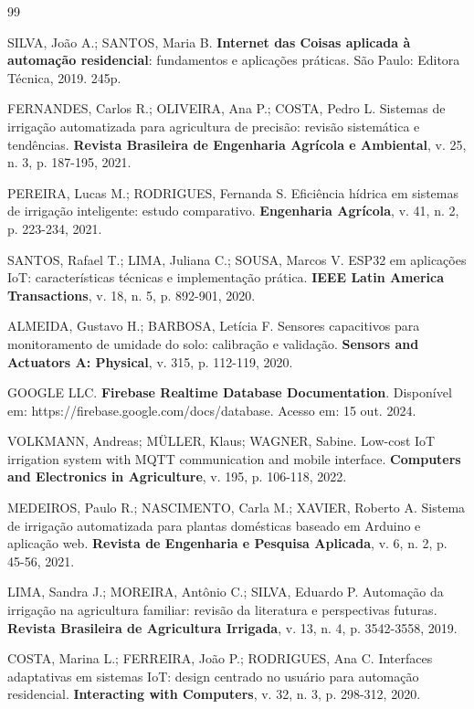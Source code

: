 \documentclass[twoside,english,brazilian]{UNISINOSmonografia}
\begin{document}

\begin{thebibliography}{99}

SILVA, João A.; SANTOS, Maria B. \textbf{Internet das Coisas aplicada à automação residencial}: fundamentos e aplicações práticas. São Paulo: Editora Técnica, 2019. 245p.

FERNANDES, Carlos R.; OLIVEIRA, Ana P.; COSTA, Pedro L. Sistemas de irrigação automatizada para agricultura de precisão: revisão sistemática e tendências. \textbf{Revista Brasileira de Engenharia Agrícola e Ambiental}, v. 25, n. 3, p. 187-195, 2021.

PEREIRA, Lucas M.; RODRIGUES, Fernanda S. Eficiência hídrica em sistemas de irrigação inteligente: estudo comparativo. \textbf{Engenharia Agrícola}, v. 41, n. 2, p. 223-234, 2021.

SANTOS, Rafael T.; LIMA, Juliana C.; SOUSA, Marcos V. ESP32 em aplicações IoT: características técnicas e implementação prática. \textbf{IEEE Latin America Transactions}, v. 18, n. 5, p. 892-901, 2020.

ALMEIDA, Gustavo H.; BARBOSA, Letícia F. Sensores capacitivos para monitoramento de umidade do solo: calibração e validação. \textbf{Sensors and Actuators A: Physical}, v. 315, p. 112-119, 2020.

GOOGLE LLC. \textbf{Firebase Realtime Database Documentation}. Disponível em: https://firebase.google.com/docs/database. Acesso em: 15 out. 2024.

VOLKMANN, Andreas; MÜLLER, Klaus; WAGNER, Sabine. Low-cost IoT irrigation system with MQTT communication and mobile interface. \textbf{Computers and Electronics in Agriculture}, v. 195, p. 106-118, 2022.

MEDEIROS, Paulo R.; NASCIMENTO, Carla M.; XAVIER, Roberto A. Sistema de irrigação automatizada para plantas domésticas baseado em Arduino e aplicação web. \textbf{Revista de Engenharia e Pesquisa Aplicada}, v. 6, n. 2, p. 45-56, 2021.

LIMA, Sandra J.; MOREIRA, Antônio C.; SILVA, Eduardo P. Automação da irrigação na agricultura familiar: revisão da literatura e perspectivas futuras. \textbf{Revista Brasileira de Agricultura Irrigada}, v. 13, n. 4, p. 3542-3558, 2019.

COSTA, Marina L.; FERREIRA, João P.; RODRIGUES, Ana C. Interfaces adaptativas em sistemas IoT: design centrado no usuário para automação residencial. \textbf{Interacting with Computers}, v. 32, n. 3, p. 298-312, 2020.


\end{thebibliography}
\end{document}
